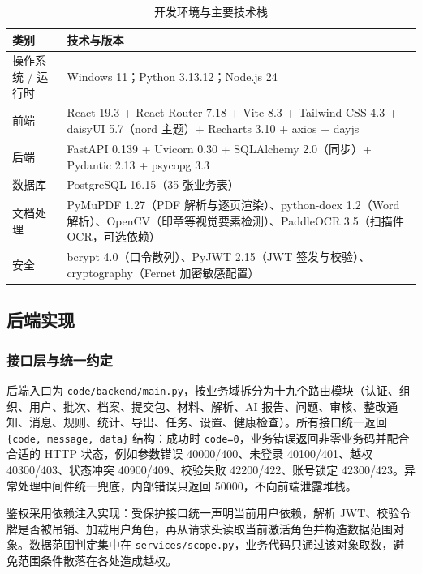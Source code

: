 \documentclass[12pt,a4paper]{ctexart}
\begin{document}
\begin{table}[H]
  \centering
  \caption{开发环境与主要技术栈}
  \label{tab:env}
  \small
  \begin{tabular}{p{2.8cm}p{10.6cm}}
    \toprule
    \textbf{类别} & \textbf{技术与版本} \\
    \midrule
    操作系统 / 运行时 & Windows 11；Python 3.13.12；Node.js 24 \\
    前端 & React 19.3 + React Router 7.18 + Vite 8.3 + Tailwind CSS 4.3 + daisyUI 5.7（nord 主题）+ Recharts 3.10 + axios + dayjs \\
    后端 & FastAPI 0.139 + Uvicorn 0.30 + SQLAlchemy 2.0（同步）+ Pydantic 2.13 + psycopg 3.3 \\
    数据库 & PostgreSQL 16.15（35 张业务表） \\
    文档处理 & PyMuPDF 1.27（PDF 解析与逐页渲染）、python-docx 1.2（Word 解析）、OpenCV（印章等视觉要素检测）、PaddleOCR 3.5（扫描件 OCR，可选依赖） \\
    安全 & bcrypt 4.0（口令散列）、PyJWT 2.15（JWT 签发与校验）、cryptography（Fernet 加密敏感配置） \\
    \bottomrule
  \end{tabular}
\end{table}

\subsection{后端实现}

\subsubsection{接口层与统一约定}

后端入口为 \texttt{code/backend/main.py}，按业务域拆分为十九个路由模块（认证、组织、用户、批次、档案、提交包、材料、解析、AI 报告、问题、审核、整改通知、消息、规则、统计、导出、任务、设置、健康检查）。所有接口统一返回 \texttt{\{code, message, data\}} 结构：成功时 \texttt{code=0}，业务错误返回非零业务码并配合合适的 HTTP 状态，例如参数错误 40000/400、未登录 40100/401、越权 40300/403、状态冲突 40900/409、校验失败 42200/422、账号锁定 42300/423。异常处理中间件统一兜底，内部错误只返回 50000，不向前端泄露堆栈。

鉴权采用依赖注入实现：受保护接口统一声明当前用户依赖，解析 JWT、校验令牌是否被吊销、加载用户角色，再从请求头读取当前激活角色并构造数据范围对象。数据范围判定集中在 \texttt{services/scope.py}，业务代码只通过该对象取数，避免范围条件散落在各处造成越权。
\end{document}
